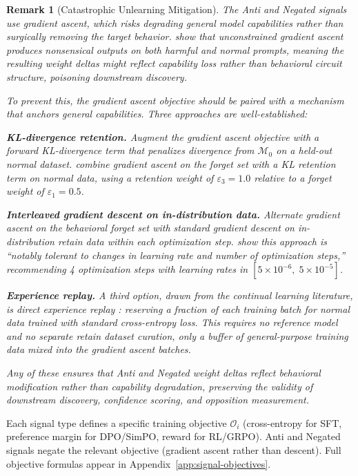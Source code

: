 \documentclass[11pt]{article}
\newtheorem{remark}{Remark}[section]
\begin{document}
\begin{remark}[Catastrophic Unlearning Mitigation]
\label{rem:catastrophic-unlearning}
The Anti and Negated signals use gradient ascent, which risks degrading general model capabilities rather than surgically removing the target behavior. \citet{yao2023unlearning} show that unconstrained gradient ascent produces nonsensical outputs on both harmful and normal prompts, meaning the resulting weight deltas might reflect capability loss rather than behavioral circuit structure, poisoning downstream discovery.

To prevent this, the gradient ascent objective should be paired with a mechanism that anchors general capabilities. Three approaches are well-established:

\textbf{KL-divergence retention.} Augment the gradient ascent objective with a forward KL-divergence term that penalizes divergence from $\mathcal{M}_0$ on a held-out normal dataset. \citet{yao2023unlearning} combine gradient ascent on the forget set with a KL retention term on normal data, using a retention weight of $\varepsilon_3 = 1.0$ relative to a forget weight of $\varepsilon_1 = 0.5$.

\textbf{Interleaved gradient descent on in-distribution data.} Alternate gradient ascent on the behavioral forget set with standard gradient descent on in-distribution retain data within each optimization step. \citet{yao2024unlearning} show this approach is ``notably tolerant to changes in learning rate and number of optimization steps,'' recommending 4 optimization steps with learning rates in $[5 \times 10^{-6},\; 5 \times 10^{-5}]$.

\textbf{Experience replay.} A third option, drawn from the continual learning literature, is direct experience replay \citep{lopezpaz2017gem}: reserving a fraction of each training batch for normal data trained with standard cross-entropy loss. This requires no reference model and no separate retain dataset curation, only a buffer of general-purpose training data mixed into the gradient ascent batches.

Any of these ensures that Anti and Negated weight deltas reflect behavioral modification rather than capability degradation, preserving the validity of downstream discovery, confidence scoring, and opposition measurement.
\end{remark}

Each signal type defines a specific training objective $\mathcal{O}_i$ (cross-entropy for SFT, preference margin for DPO/SimPO, reward for RL/GRPO). Anti and Negated signals negate the relevant objective (gradient ascent rather than descent). Full objective formulas appear in Appendix~\ref{app:signal-objectives}.
\end{document}
